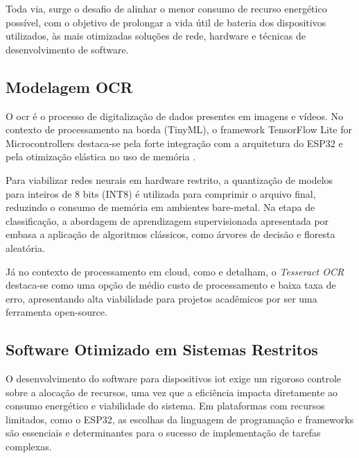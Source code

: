 Toda via, surge o desafio de alinhar o menor consumo de recurso energético possível, com o objetivo de prolongar a vida útil de bateria dos dispositivos utilizados, às mais otimizadas soluções de rede, hardware e técnicas de desenvolvimento de software.


\subsection{Modelagem OCR}

O \gls{ocr} é o processo de digitalização de dados presentes em imagens e vídeos. No contexto de processamento na borda (TinyML), o framework TensorFlow Lite for Microcontrollers destaca-se pela forte integração com a arquitetura do ESP32 e pela otimização elástica no uso de memória .

Para viabilizar redes neurais em hardware restrito, a quantização de modelos para inteiros de 8 bits (INT8)  é utilizada para comprimir o arquivo final, reduzindo o consumo de memória em ambientes bare-metal. 
Na etapa de classificação, a abordagem de aprendizagem supervisionada apresentada por  embasa a aplicação de algoritmos clássicos, como árvores de decisão e floresta aleatória.

Já no contexto de processamento em cloud, como  e  detalham, o \textit{Tesseract OCR} destaca-se como uma opção de médio custo de processamento e baixa taxa de erro, apresentando alta viabilidade para projetos acadêmicos por ser uma ferramenta open-source.



\subsection{Software Otimizado em Sistemas Restritos}

O desenvolvimento do software para dispositivos \gls{iot} exige um rigoroso controle sobre a alocação de recursos, uma vez que a eficiência impacta diretamente ao consumo energético e viabilidade do sistema. 
Em plataformas com recursos limitados, como o ESP32, as escolhas da linguagem de programação e frameworks são essenciais e determinantes para o sucesso de implementação de tarefas complexas.

